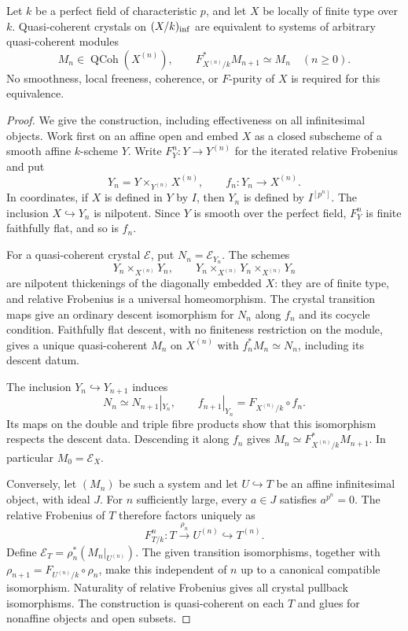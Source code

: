 \begin{lemma}\label{lem:DE-crystal-Fdiv}
Let $k$ be a perfect field of characteristic $p$, and let $X$ be locally of finite type over $k$.  Quasi-coherent crystals on $(X/k)_{\rm inf}$ are equivalent to systems of arbitrary quasi-coherent modules
\[
       M_n\in\operatorname{QCoh}(X^{(n)}),\qquad
       F_{X^{(n)}/k}^*M_{n+1}\simeq M_n\quad(n\geq0).
\]
No smoothness, local freeness, coherence, or $F$-purity of $X$ is required for this equivalence.
\end{lemma}
\begin{proof}
We give the construction, including effectiveness on all infinitesimal objects.  Work first on an affine open and embed $X$ as a closed subscheme of a smooth affine $k$-scheme $Y$.  Write $F_Y^n:Y\to Y^{(n)}$ for the iterated relative Frobenius and put
\[
       Y_n=Y\times_{Y^{(n)}}X^{(n)},\qquad
       f_n:Y_n\longrightarrow X^{(n)}.
\]
In coordinates, if $X$ is defined in $Y$ by $I$, then $Y_n$ is defined by $I^{[p^n]}$.  The inclusion $X\hookrightarrow Y_n$ is nilpotent.  Since $Y$ is smooth over the perfect field, $F_Y^n$ is finite faithfully flat, and so is $f_n$.

For a quasi-coherent crystal $\mathcal E$, put $N_n=\mathcal E_{Y_n}$.  The schemes
\[
       Y_n\times_{X^{(n)}}Y_n,\qquad
       Y_n\times_{X^{(n)}}Y_n\times_{X^{(n)}}Y_n
\]
are nilpotent thickenings of the diagonally embedded $X$: they are of finite type, and relative Frobenius is a universal homeomorphism.  The crystal transition maps give an ordinary descent isomorphism for $N_n$ along $f_n$ and its cocycle condition.  Faithfully flat descent, with no finiteness restriction on the module, gives a unique quasi-coherent $M_n$ on $X^{(n)}$ with $f_n^*M_n\simeq N_n$, including its descent datum.

The inclusion $Y_n\hookrightarrow Y_{n+1}$ induces
\[
       N_n\simeq N_{n+1}|_{Y_n},\qquad
       f_{n+1}|_{Y_n}=F_{X^{(n)}/k}\circ f_n.
\]
Its maps on the double and triple fibre products show that this isomorphism respects the descent data.  Descending it along $f_n$ gives
$M_n\simeq F_{X^{(n)}/k}^*M_{n+1}$.  In particular $M_0=\mathcal E_X$.

Conversely, let $(M_n)$ be such a system and let $U\hookrightarrow T$ be an affine infinitesimal object, with ideal $J$.  For $n$ sufficiently large, every $a\in J$ satisfies $a^{p^n}=0$.  The relative Frobenius of $T$ therefore factors uniquely as
\[
       F_{T/k}^n:T\xrightarrow{\rho_n}U^{(n)}
                        \hookrightarrow T^{(n)}.
\]
Define $\mathcal E_T=\rho_n^*(M_n|_{U^{(n)}})$.  The given transition isomorphisms, together with
$\rho_{n+1}=F_{U^{(n)}/k}\circ\rho_n$, make this independent of $n$ up to a canonical compatible isomorphism.  Naturality of relative Frobenius gives all crystal pullback isomorphisms.  The construction is quasi-coherent on each $T$ and glues for nonaffine objects and open subsets.


\end{proof}
